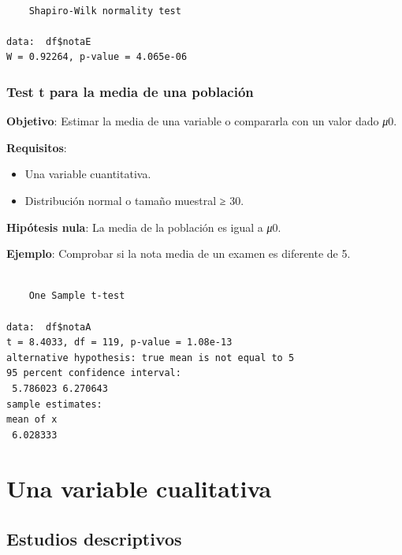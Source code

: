 \documentclass[
  spanish,
  a4paper,
]{scrreport}
\newenvironment{Shaded}{\begin{snugshade}}{\end{snugshade}}
\newcommand{\AttributeTok}[1]{\textcolor[rgb]{0.40,0.45,0.13}{#1}}
\newcommand{\DecValTok}[1]{\textcolor[rgb]{0.68,0.00,0.00}{#1}}
\newcommand{\FunctionTok}[1]{\textcolor[rgb]{0.28,0.35,0.67}{#1}}
\newcommand{\NormalTok}[1]{\textcolor[rgb]{0.00,0.23,0.31}{#1}}
\newcommand{\SpecialCharTok}[1]{\textcolor[rgb]{0.37,0.37,0.37}{#1}}
\newcommand{\StringTok}[1]{\textcolor[rgb]{0.13,0.47,0.30}{#1}}
\providecommand{\tightlist}{%
  \setlength{\itemsep}{0pt}\setlength{\parskip}{0pt}}
\theoremstyle{definition}
\theoremstyle{definition}
\theoremstyle{remark}
\begin{document}
\begin{verbatim}

    Shapiro-Wilk normality test

data:  df$notaE
W = 0.92264, p-value = 4.065e-06
\end{verbatim}

\subsubsection{Test t para la media de una
población}\label{test-t-para-la-media-de-una-poblaciuxf3n}

\textbf{Objetivo}: Estimar la media de una variable o compararla con un
valor dado \emph{μ}0.

\textbf{Requisitos}:

\begin{itemize}
\tightlist
\item
  Una variable cuantitativa.
\item
  Distribución normal o tamaño muestral ≥ 30.
\end{itemize}

\textbf{Hipótesis nula}: La media de la población es igual a \emph{μ}0.

\textbf{Ejemplo}: Comprobar si la nota media de un examen es diferente
de 5.

\begin{Shaded}
\end{Shaded}

\begin{verbatim}

    One Sample t-test

data:  df$notaA
t = 8.4033, df = 119, p-value = 1.08e-13
alternative hypothesis: true mean is not equal to 5
95 percent confidence interval:
 5.786023 6.270643
sample estimates:
mean of x 
 6.028333 
\end{verbatim}

\section{Una variable cualitativa}\label{una-variable-cualitativa}

\subsection{Estudios descriptivos}\label{estudios-descriptivos-1}
\end{document}
